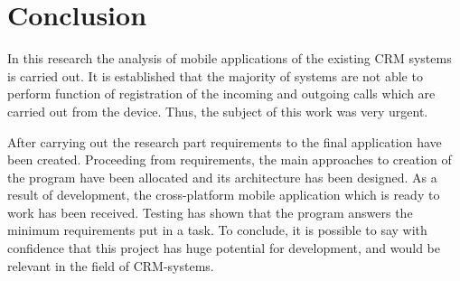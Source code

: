 \section{Conclusion}
In this research the analysis of mobile applications of the existing CRM systems is carried out. It is established that the majority of systems are not able to perform function of registration of the incoming and outgoing calls which are carried out from the device. Thus, the subject of this work was very urgent.

After carrying out the research part requirements to the final application have been created. Proceeding from requirements, the main approaches to creation of the program have been allocated and its architecture has been designed. As a result of development, the cross-platform mobile application which is ready to work has been received. Testing has shown that the program answers the minimum requirements put in a task. To conclude, it is possible to say with confidence that this project has huge potential for development, and would be relevant in the field of CRM-systems.
